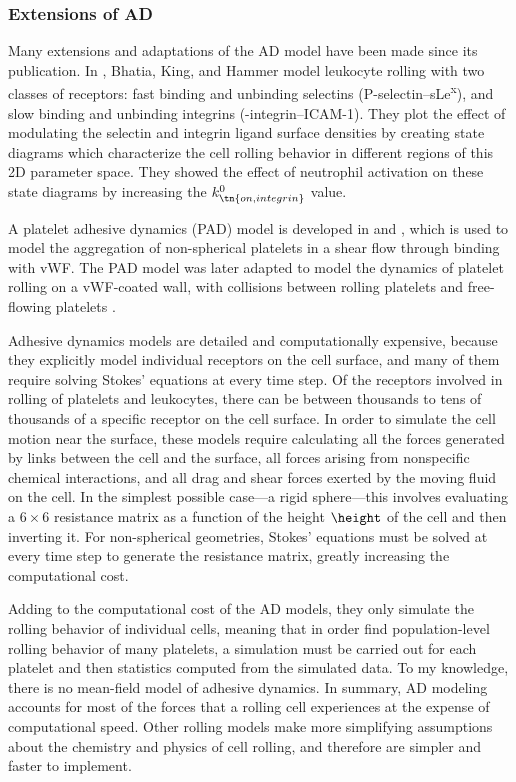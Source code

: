 \subsubsection{Extensions of AD}
\label{sec:extensions-ad}

Many extensions and adaptations of the AD model have been made since
its publication. In \cite{Bhatia2003}, Bhatia, King, and Hammer model
leukocyte rolling with two classes of receptors: fast binding and
unbinding selectins (P-selectin--sLe\textsuperscript{x}), and slow
binding and unbinding integrins (-integrin--ICAM-1). They plot
the effect of modulating the selectin and integrin ligand surface
densities by creating state diagrams which characterize the cell
rolling behavior in different regions of this 2D parameter space. They
showed the effect of neutrophil activation on these state diagrams by
increasing the $k_\tn{on, integrin}^0$ value.

A platelet adhesive dynamics (PAD) model is developed in
\cite{Mody2008a} and \cite{Mody2008b}, which is used to model the
aggregation of non-spherical platelets in a shear flow through binding
with vWF. The PAD model was later adapted to model the dynamics of
platelet rolling on a vWF-coated wall, with collisions between rolling
platelets and free-flowing platelets \cite{Wang2013}.

Adhesive dynamics models are detailed and computationally expensive,
because they explicitly model individual receptors on the cell
surface, and many of them require solving Stokes' equations at every
time step. Of the receptors involved in rolling of platelets and
leukocytes, there can be between thousands to tens of thousands of a
specific receptor on the cell surface. In order to simulate the cell
motion near the surface, these models require calculating all the
forces generated by links between the cell and the surface, all forces
arising from nonspecific chemical interactions, and all drag and shear
forces exerted by the moving fluid on the cell. In the simplest
possible case---a rigid sphere---this involves evaluating a
$6 \times 6$ resistance matrix as a function of the height $\height$
of the cell and then inverting it. For non-spherical geometries,
Stokes' equations must be solved at every time step to generate the
resistance matrix, greatly increasing the computational cost.

Adding to the computational cost of the AD models, they only simulate
the rolling behavior of individual cells, meaning that in order find
population-level rolling behavior of many platelets, a simulation must
be carried out for each platelet and then statistics computed from the
simulated data. To my knowledge, there is no mean-field model of
adhesive dynamics. In summary, AD modeling accounts for most of the
forces that a rolling cell experiences at the expense of computational
speed. Other rolling models make more simplifying assumptions about
the chemistry and physics of cell rolling, and therefore are simpler
and faster to implement.

